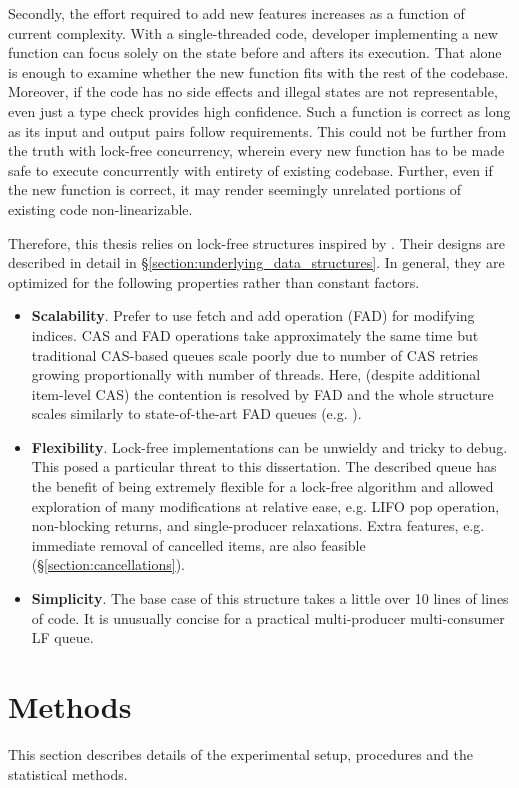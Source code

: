 \documentclass[12pt,a4paper,twoside]{report}
\begin{document}
Secondly, the effort required to add new features increases as a function of current complexity. With a single-threaded code, developer implementing a new function can focus solely on the state before and afters its execution. That alone is enough to examine whether the new function fits with the rest of the codebase. Moreover, if the code has no side effects and illegal states are not representable, even just a type check provides high confidence. Such a function is correct as long as its input and output pairs follow requirements. This could not be further from the truth with lock-free concurrency, wherein every new function has to be made safe to execute concurrently with entirety of existing codebase. Further, even if the new function is correct, it may render seemingly unrelated portions of existing code non-linearizable. 

Therefore, this thesis relies on lock-free structures inspired by \citet{Kappes2021}. Their designs are described in detail in \S\ref{section:underlying_data_structures}. In general, they are optimized for the following properties rather than constant factors.  
\begin{itemize}
    \item \textbf{Scalability}. Prefer to use fetch and add operation (FAD) for modifying indices. CAS and FAD operations take approximately the same time \cite{fad-cas-speed} but traditional CAS-based queues scale poorly due to number of CAS retries growing proportionally with number of threads. Here, (despite additional item-level CAS) the contention is resolved by FAD and the whole structure scales similarly to state-of-the-art FAD queues (e.g. \cite{Yang2016}).
    \item \textbf{Flexibility}. Lock-free implementations can be unwieldy and tricky to debug. This posed a particular threat to this dissertation. The described queue has the benefit of being extremely flexible for a lock-free algorithm and allowed exploration of many modifications at relative ease, e.g. LIFO pop operation, non-blocking returns, and single-producer relaxations. Extra features, e.g. immediate removal of cancelled items, are also feasible (\S\ref{section:cancellations}).
    \item \textbf{Simplicity}. The base case of this structure takes a little over 10 lines of lines of code. It is unusually concise for a practical multi-producer multi-consumer LF queue. 
\end{itemize}


\section{Methods}
\label{section:methods}
This section describes details of the experimental setup, procedures and the statistical methods.
\end{document}
